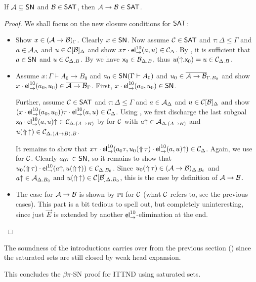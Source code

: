 \begin{lemma}
  \label{lem:fun-sat-pi}
  If $\mathcal{A} \subseteq \mathsf{SN}$ and $\mathcal{B} \in \mathsf{SAT}$, then $\mathcal{A} \to \mathcal{B} \in \mathsf{SAT}$.
\end{lemma}
\begin{proof}
  We shall focus on the new closure conditions for $\mathsf{SAT}$:
\begin{itemize}
\item[\rvar] Show $x \in (\mathcal{A} \to \mathcal{B})_\Gamma$.  Clearly $x \in \mathsf{SN}$.
  Now assume $\mathcal{C} \in \mathsf{SAT}$ and $\tau : \Delta \leq \Gamma$ and
  $a \in \mathcal{A}_\Delta$ and $u \in \mathcal{C}[\mathcal{B}]_\Delta$ and show
  $x\tau \cdot \mathsf{el}_{\to}^{10}(a,u) \in \mathcal{C}_\Delta$.
  By \rel, it is sufficient that $a \in \mathsf{SN}$ and
  $u \in \mathcal{C}_{\Delta.B}$.
  By \rvar we have $\mathsf{x}_0 \in \mathcal{B}_{\Delta.B}$,
  thus $u(\mathord{\uparrow}.\mathsf{x}_0) = u \in \mathcal{C}_{\Delta.B}$.

\item[\rel] Assume $x : \Gamma \vdash A_0 \to B_0$ and
  $a_0 \in \mathsf{SN}(\Gamma \vdash A_0)$ and
  $u_0 \in \overline{\mathcal{A} \to \mathcal{B}}_{\Gamma.B_0}$ and show
  $x \cdot \mathsf{el}_{\to}^{10}(a_0,u_0) \in \overline{\mathcal{A} \to \mathcal{B}}_\Gamma$.
  First, $x \cdot \mathsf{el}_{\to}^{10}(a_0,u_0) \in \mathsf{SN}$.

  Further, assume $\mathcal{C} \in \mathsf{SAT}$ and $\tau : \Delta \leq \Gamma$
  and $a \in \mathcal{A}_\Delta$ and $u \in \mathcal{C}[\mathcal{B}]_\Delta$ and show
  $(x \cdot \mathsf{el}_{\to}^{10}(a_0,u_0))\tau \cdot \mathsf{el}_{\to}^{10}(a,u) \in \mathcal{C}_\Delta$.
  Using \rpi, we first discharge the last subgoal $\mathsf{x}_0 \cdot
  \mathsf{el}_{\to}^{10}(a,u)\mathord{\uparrow} \in \mathcal{C}_{\Delta.(A \to B)}$ by \rel for $\mathcal{C}$ with
  $a\mathord{\uparrow} \in \mathcal{A}_{\Delta.(A \to B)}$ and $u(\mathop{\Uparrow}\mathord{\uparrow}) \in \mathcal{C}_{\Delta.(A\to
    B).B}$.

  It remains to show that $x\tau \cdot \mathsf{el}_{\to}^{10}(a_0\tau, u_0(\mathop{\Uparrow}\tau) \cdot
  \mathsf{el}_{\to}^{10}(a,u)\mathord{\uparrow}) \in \mathcal{C}_\Delta$.  Again, we use \rel for $\mathcal{C}$.
  Clearly $a_0\tau \in \mathsf{SN}$, so it remains to show that
  $u_0(\mathop{\Uparrow}\tau) \cdot \mathsf{el}_{\to}^{10}(a\mathord{\uparrow},u(\mathop{\Uparrow}\mathord{\uparrow})) \in \mathcal{C}_{\Delta.B_0}$.
  Since $u_0(\mathop{\Uparrow}\tau) \in (\mathcal{A} \to \mathcal{B})_{\Delta.B_0}$
  and $a\mathord{\uparrow} \in \mathcal{A}_{\Delta.B_0}$ and $u(\mathop{\Uparrow}\mathord{\uparrow}) \in
  \mathcal{C}[\mathcal{B}]_{\Delta.B_0}$,
  this is the case by definition of $\mathcal{A} \to \mathcal{B}$.

\item[\rpi]
  The case \rpi for $\mathcal{A} \to \mathcal{B}$ is shown by $\mbox{\textsc{pi}}$ for $\mathcal{C}$ (what $\mathcal{C}$
  refers to, see the previous cases).  This part is a bit tedious to
  spell out, but completely uninteresting, since just $\vec E$ is extended
  by another $\mathsf{el}_{\to}^{10}$-elimination at the end.
%
\popQED
\end{itemize}
\end{proof}

The soundness of the introductions carries over from the previous
section () since the saturated sets are still
closed by weak head expansion.

This concludes the $\beta\pi$-SN proof for ITTND using saturated sets.

